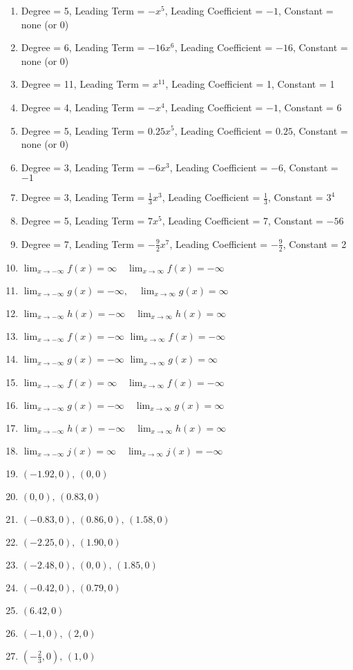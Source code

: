 \begin{enumerate}
	\item Degree = 5, Leading Term = $-x^5$, Leading Coefficient = $-1$, Constant = none (or 0)
	\item Degree = 6, Leading Term = $-16x^6$, Leading Coefficient = $-16$, Constant = none (or 0)
	\item Degree = 11, Leading Term = $x^{11}$, Leading Coefficient = 1, Constant = 1
	\item Degree = 4, Leading Term = $-x^4$, Leading Coefficient = $-1$, Constant = 6
	\item Degree = 5, Leading Term = $0.25x^5$, Leading Coefficient = $0.25$, Constant = none (or 0)
	\item Degree = 3, Leading Term = $-6x^3$, Leading Coefficient = $-6$, Constant = $-1$
	\item Degree = 3, Leading Term = $\frac{1}{3}x^3$, Leading Coefficient = $\frac{1}{3}$, Constant = $3^4$
	\item Degree = 5, Leading Term = $7x^5$, Leading Coefficient = 7, Constant = $-56$
	\item Degree = 7, Leading Term = $-\frac{9}{2}x^7$, Leading Coefficient = $-\frac{9}{2}$, Constant = 2
	\item $\displaystyle \lim_{x \to -\infty} f(x) = \infty \quad \lim_{x \to \infty}f(x) = -\infty$
	\item $\displaystyle \lim_{x \to -\infty} g(x) = -\infty, \quad \lim_{x \to \infty}g(x) = \infty$
	\item $\displaystyle \lim_{x \to -\infty} h(x) = -\infty \quad \lim_{x \to \infty}h(x) =\infty$
	\item $\displaystyle \lim_{x \to -\infty}f(x) = -\infty$ \quad $\lim_{x \to \infty}f(x) = -\infty$
    \item $\displaystyle \lim_{x \to -\infty}g(x) = -\infty$ \quad $\lim_{x \to \infty}g(x) = \infty$
    \item $\displaystyle \lim_{x \to -\infty} f(x) = \infty \quad \lim_{x \to \infty} f(x) = - \infty$
    \item $\displaystyle \lim_{x \to -\infty} g(x) = -\infty \quad \lim_{x \to \infty} g(x) = \infty$
    \item $\displaystyle \lim_{x \to -\infty} h(x) = -\infty \quad \lim_{x \to \infty} h(x) = \infty$
     \item $\displaystyle \lim_{x \to -\infty} j(x) = \infty \quad \lim_{x \to \infty} j(x) = -\infty$
     \item $(-1.92,0), \, (0,0)$
     \item $(0,0), \, (0.83,0)$
     \item $(-0.83,0), \, (0.86,0), \, (1.58,0)$
     \item $(-2.25,0), \, (1.90,0)$
     \item $(-2.48,0), \, (0,0), \, (1.85,0)$
     \item $(-0.42,0), \, (0.79,0)$
     \item $(6.42,0)$
     \item $(-1,0), \, (2,0)$
     \item $\left(-\frac{2}{3},0\right), \, (1,0)$
\end{enumerate}